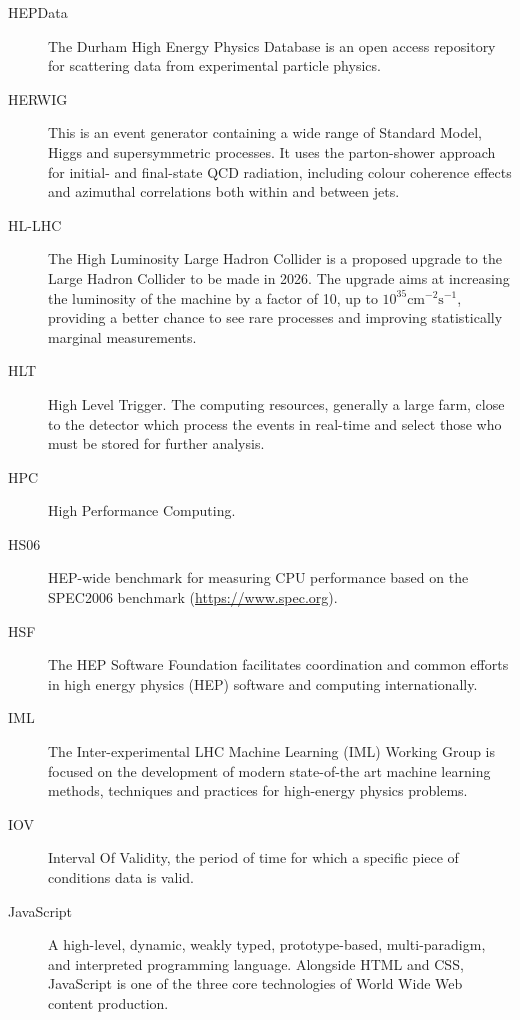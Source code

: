 \documentclass[twocolumn]{svjour3}          %
\begin{document}
\begin{appendices}
\begin{description}
\item[HEPData] The Durham High Energy Physics Database is an open access
repository for scattering data from experimental particle physics.

\item[HERWIG] This is an event generator containing a wide range of Standard
Model, Higgs and supersymmetric processes. It uses the parton-shower approach
for initial- and final-state QCD radiation, including colour coherence effects and 
azimuthal correlations both within and between jets.

\item[HL-LHC] The High Luminosity Large Hadron Collider is a proposed upgrade to
the Large Hadron Collider to be made in 2026. The upgrade aims at increasing the 
luminosity of the machine by a factor of 10, up to 
$10^{35}\mathrm{cm}^{-2}\mathrm{s}^{-1}$, 
providing a better chance to see rare processes and improving
statistically marginal measurements.

\item[HLT] High Level Trigger. The computing resources, generally a large farm, close to the detector which process the events in real-time and select those who must be stored for further analysis.

\item[HPC] High Performance Computing.

\item[HS06] HEP-wide benchmark for measuring CPU performance based on the SPEC2006 benchmark
(\href{https://www.spec.org}{{https://www.spec.org}}).

\item[HSF] The HEP Software Foundation facilitates coordination and common
efforts in high energy physics (HEP) software and computing
internationally.

\item[IML] The Inter-experimental LHC Machine Learning (IML) Working Group is
focused on the development of modern state-of-the art machine learning
methods, techniques and practices for high-energy physics problems.

\item[IOV] Interval Of Validity, the period of time for which a specific piece
of conditions data is valid.

\item[JavaScript] A high-level, dynamic, weakly typed,
prototype-based, multi-paradigm, and interpreted programming language.
Alongside HTML and CSS, JavaScript is one of the three core technologies
of World Wide Web content production.


\end{description}
\end{appendices}
\end{document}
